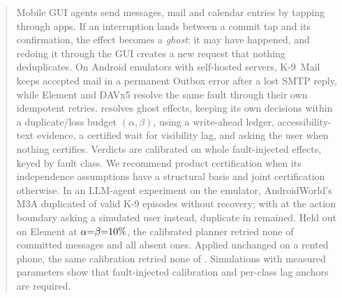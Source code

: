 \begin{abstract}
Mobile GUI agents send messages, mail and calendar entries by tapping through apps. If an interruption lands between a commit tap and its confirmation, the effect becomes a \emph{ghost}: it may have happened, and redoing it through the GUI creates a new request that nothing deduplicates. On Android emulators with self-hosted servers, K-9~Mail keeps accepted mail in a permanent Outbox error after a lost SMTP reply, while Element and DAVx5 resolve the same fault through their
own idempotent retries. \sys resolves ghost effects, keeping its own decisions within a duplicate/loss budget $(\alpha,\beta)$, using a write-ahead ledger, accessibility-text evidence, a certified wait
for visibility lag, and asking the user when nothing certifies. Verdicts are calibrated on whole fault-injected effects, keyed by fault class. We recommend product certification when
its independence assumptions have a structural basis and joint certification otherwise. In an LLM-agent experiment on the emulator, AndroidWorld's M3A duplicated \AgentDupN{} of
\AgentValidN{} valid K-9 episodes without recovery; with \sys at the action boundary asking a simulated user instead, \AgentGuardDupN{} duplicate in \AgentGuardValidN{} remained. Held out on Element at $\alpha{=}\beta{=}\RealPlanAlphaPct\%$, the calibrated planner retried none of \RealElPlanCommittedN{} committed messages and all \RealElPlanRetryAbsent{} absent ones. Applied unchanged on a rented phone, the same calibration retried none of \PixTCom. Simulations with measured parameters show that fault-injected calibration and per-class lag anchors are required.
\end{abstract}
